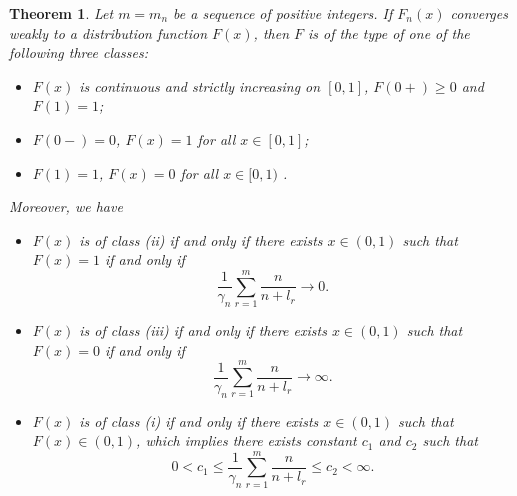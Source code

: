 \documentclass[12pt]{article}
\theoremstyle{plain}
\newtheorem{thm}{\textbf{Theorem}}
\theoremstyle{definition}
\theoremstyle{remark}
\begin{document}
\begin{thm}\label{thm:classification}
    Let $m=m_n$ be a sequence of positive integers. If $F_n(x)$ converges weakly to a distribution function $F(x)$, then $F$ is of the type of one of the following three classes:
    \begin{itemize}
    \item[(i).] $F(x)$ is continuous and strictly increasing on $[0,1]$, $F(0+)\geq0$ and
    $F(1)=1$;

    \item[(ii).] $F(0-)=0$, $F(x)=1$ for all $x\in [0,1]$;

    \item[(iii).] $F(1)=1$, $F(x)=0$ for all $x\in [0,1)$ .
    \end{itemize}
    Moreover,  we have
\begin{itemize}
\item[(a).] $F(x)$ is of class (ii) if and only if there exists $x\in
(0,1)$ such that $F(x)=1$ if and only if
    \begin{equation*}
    \frac{1}{\gamma_{n}} \sum_{r=1}^{m} \frac{n}{n+l_{r}} \rightarrow 0.
    \end{equation*}
\item[(b).]
    $F(x)$ is of class (iii) if and only if there exists $x\in (0,1)$ such that $F(x)=0$ if and only if
    \begin{equation*}
    \frac{1}{\gamma_{n}} \sum_{r=1}^{m} \frac{n}{n+l_{r}} \rightarrow
    \infty.
    \end{equation*}
\item[(c).]
    $F(x)$ is of class (i) if and only if there exists $x\in (0,1)$ such that $F(x)\in (0,1)$, which implies
    there exists constant $c_1$ and $c_2$ such that
    \begin{equation}
    0<c_{1} \leqslant \frac{1}{\gamma_{n}} \sum_{r=1}^{m} \frac{n}{n+l_{r}} \leqslant c_{2}<\infty.
    \end{equation}
\end{itemize}
\end{thm}
\end{document}
